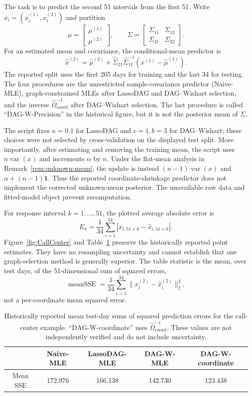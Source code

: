 \documentclass[12pt]{article}
\theoremstyle{plain}
\theoremstyle{definition}
\theoremstyle{remark}
\begin{document}
The task is to predict the second 51 intervals from the first 51.  Write
$x_i=(x_i^{(1)},x_i^{(2)})$ and partition
\[
\mu=\begin{bmatrix}\mu^{(1)}\\ \mu^{(2)}\end{bmatrix},\qquad
\Sigma=\begin{bmatrix}
\Sigma_{11}&\Sigma_{12}\\
\Sigma_{21}&\Sigma_{22}
\end{bmatrix}.
\]
For an estimated mean and covariance, the conditional-mean predictor is
\[
\widehat x^{(2)}=\widehat\mu^{(2)}+
\widehat\Sigma_{21}\widehat\Sigma_{11}^{-1}
(x^{(1)}-\widehat\mu^{(1)}).
\]
The reported split uses the first 205 days for training and the last 34 for
testing.  The four procedures are the unrestricted sample-covariance
predictor (Naive-MLE), graph-constrained MLEs after LassoDAG and DAG--Wishart
selection, and the inverse
$\widehat\Omega_{\mathrm{coord}}^{-1}$ after DAG--Wishart selection.  The
last procedure is called ``DAG-W-Precision'' in the historical figure, but
it is not the posterior mean of $\Sigma$.

The script fixes $\kappa=0.1$ for LassoDAG and $c=1,b=3$ for DAG--Wishart;
these choices were not selected by cross-validation on the displayed test
split.  More importantly, after estimating and removing the training mean,
the script uses $n\operatorname{var}(x)$ and increments $\alpha$ by $n$.
Under the flat-mean analysis in Remark~\ref{rem:unknown-mean}, the update is
instead $(n-1)\operatorname{var}(x)$ and $\alpha+(n-1)\mathbf 1$.  Thus the
reported coordinate-shrinkage predictor does not implement the corrected
unknown-mean posterior.  The unavailable raw data and fitted-model object
prevent recomputation.

For response interval $k=1,\ldots,51$, the plotted average absolute error is
\[
E_k=\frac1{34}\sum_{i=1}^{34}
\left|x_{i,51+k}-\widehat x_{i,51+k}\right|.
\]
Figure~\ref{fig:CallCenter} and Table~\ref{CallCenterMSE} preserve the
historically reported point estimates.  They have no resampling uncertainty
and cannot establish that one graph-selection method is generally superior.
The table statistic is the mean, over test days, of the 51-dimensional sum
of squared errors,
\[
\operatorname{meanSSE}=\frac1{34}\sum_{i=1}^{34}
\lVert x_i^{(2)}-\widehat x_i^{(2)}\rVert_2^2,
\]
not a per-coordinate mean squared error.
\enlargethispage{3\baselineskip}
\begin{table}[H]
\centering
\small
\begin{tabular}{|c|c|c|c|c|}
  \hline
 & Naive-MLE & LassoDAG-MLE & DAG-W-MLE &DAG-W-coordinate\\ 
  \hline
Mean SSE & 172.976 &  166.138 & 142.730 & 123.438 \\ 
   \hline
\end{tabular}
\caption{Historically reported mean test-day sums of squared prediction
errors for the call-center example.  ``DAG-W-coordinate'' uses
$\widehat\Omega_{\mathrm{coord}}^{-1}$.  These values are not independently
verified and do not include uncertainty.}
\label{CallCenterMSE}
\end{table}
\end{document}
